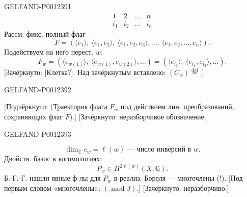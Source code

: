 \begin{GelfandAdjacentEvidence}{GELFAND-P001239}{1}
\begin{equation*}
\begin{array}{cccc}
1&2&\ldots&n\\
i_1&i_2&\ldots&i_n
\end{array}
\end{equation*}
Рассм. фикс. полный флаг
\begin{equation*}
F=(\langle e_1\rangle,\ \langle e_1,e_2\rangle,\ \langle e_1,e_2,e_3\rangle,\ldots,\ \langle e_1,e_2,\ldots,e_n\rangle).
\end{equation*}
Подействуем на него перест. $w$:
\begin{equation*}
F_w=(\langle e_{w(1)}\rangle,\ \langle e_{w(1)},e_{w(2)}\rangle,\ldots)
=(\langle e_{i_1}\rangle,\ \langle e_{i_1},e_{i_2}\rangle,\ldots).
\end{equation*}
[Зачёркнуто: [Клетка?]. Над зачёркнутым вставлено: $(C_w)\overset{\mathrm{def}}{=}$.]
\end{GelfandAdjacentEvidence}
\begin{GelfandAdjacentEvidence}{GELFAND-P001239}{2}

[Подчёркнуто: (Траектория флага $F_w$ под действием лин. преобразований, сохраняющих флаг $F$).]
[Зачёркнуто: неразборчивое обозначение.]
\end{GelfandAdjacentEvidence}
\begin{GelfandAdjacentEvidence}{GELFAND-P001239}{3}

\begin{equation*}
\dim_{\mathbb C} c_w=\ell(w)\text{ — число инверсий в }w.
\end{equation*}
Двойств. базис в когомологиях:
\begin{equation*}
P_w\in H^{2\ell(w)}(X;\mathbb Q).
\end{equation*}
Б.-Г.-Г. нашли явные ф-лы для $P_w$ в реализ. Бореля — многочлены (!).
[Под первым словом «многочлены»: $(\operatorname{mod}J)$.]
[Зачёркнуто: неразборчиво.]
\end{GelfandAdjacentEvidence}
